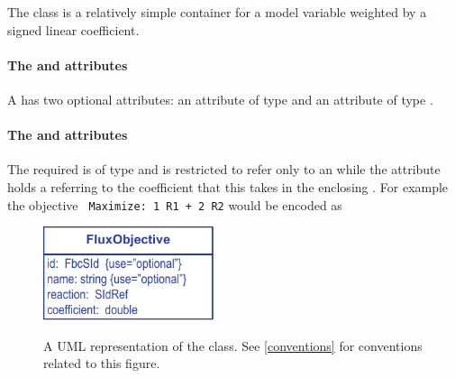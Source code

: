 The \FluxObjective class is a relatively simple container for a model
variable weighted by a signed linear coefficient.

\paragraph{The  and  attributes}
A \FluxObjective has two optional attributes:  an attribute of type  and  an attribute of type .

\paragraph{The  and  attributes}
The required  is of type  and is restricted to refer only to an \SBML \Reaction while the  attribute holds a  referring to the coefficient that this \FluxObjective takes in the enclosing \Objective. For example the objective \texttt{ Maximize: 1 R1 + 2 R2} would be encoded as
%
%


\begin{figure}[h]
  \centering
  \includegraphics[width=5cm]{images/fbc_uml_fobj.pdf}\\
  \caption{A UML representation of the \FBCPackage \FluxObjective class. See
  \ref{conventions} for conventions related to this figure.}
  \label{fig:fbc_uml_fobj}
\end{figure}
